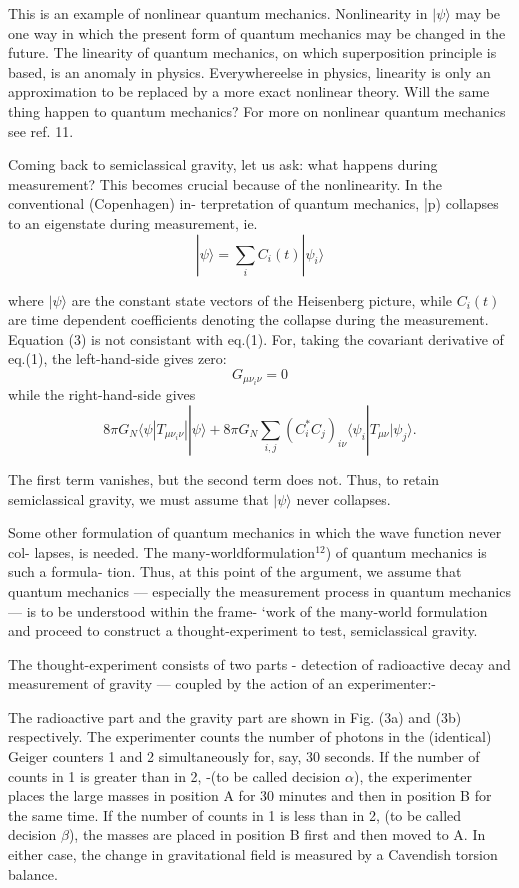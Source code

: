 This is an example of nonlinear quantum mechanics. Nonlinearity in $|\psi\rangle$ may be one
way in which the present form of quantum mechanics may be changed in the future. The
linearity of quantum mechanics, on which superposition principle is based, is an anomaly
in physics. Everywhereelse in physics, linearity is only an approximation to be replaced by
a more exact nonlinear theory. Will the same thing happen to quantum mechanics? For
more on nonlinear quantum mechanics see ref. 11.

Coming back to semiclassical gravity, let us ask: what happens during measurement?
This becomes crucial because of the nonlinearity. In the conventional (Copenhagen) in-
terpretation of quantum mechanics, |p) collapses to an eigenstate during measurement, ie.
\begin{equation*}
| \psi \rangle = \sum_{i} C_{i}(t) | \psi_{i}\rangle \tag{3}
\end{equation*}

where $|\psi\rangle$ are the constant state vectors of the Heisenberg picture, while $C_{i}(t)$ are time
dependent coefficients denoting the collapse during the measurement. Equation (3) is not
consistant with eq.(1). For, taking the covariant derivative of eq.(1), the left-hand-side
gives zero:
$$
G_{\mu \nu_{i} \nu} = 0
$$
while the right-hand-side gives
$$
8\pi G_{N} \langle \psi | T_{\mu \nu_{i} \nu}| | \psi \rangle + 8\pi G_{N} \sum_{i, j} (C_{i}^{*} C_{j})_{i \nu} \langle \psi_{i} | T_{\mu \nu} | \psi_{j}\rangle.
$$

The first term vanishes, but the second term does not. Thus, to retain semiclassical gravity,
we must assume that $|\psi \rangle$ never collapses.

Some other formulation of quantum mechanics in which the wave function never col-
lapses, is needed. The many-world\break formulation$^{12}$) of quantum mechanics is such a formula-
tion. Thus, at this point of the argument, we assume that quantum mechanics — especially
the measurement process in quantum mechanics — is to be understood within the frame-
‘work of the many-world formulation and proceed to construct a thought-experi\break ment to
test, semiclassical gravity.

The thought-experiment consists of two parts - detection of radioactive decay and
measurement of gravity — coupled by the action of an experimenter:-

The radioactive part and the gravity part are shown in Fig.
(3a) and (3b) respectively.
The experimenter counts the number of photons in the (identical) Geiger counters 1 and
2 simultaneously for, say, 30 seconds.
If the number of counts in 1 is greater than in 2,
-(to be called decision $\alpha$), the experimenter places the large masses in position A for 30
minutes and then in position B for the same time. If the number of counts in 1 is less than
in 2, (to be called decision $\beta$), the masses are placed in position B first and then moved
to A. In either case, the change in gravitational field is measured by a Cavendish torsion
balance.

